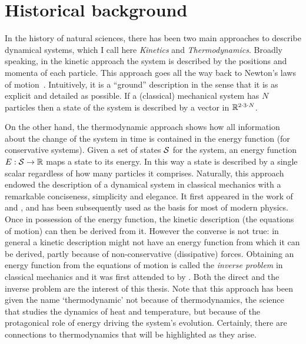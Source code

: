 % 
\section{Historical background}
In the history of natural sciences,
there has been two main approaches to describe dynamical systems,
which I call here
\emph{Kinetics} and \emph{Thermodynamics}.
Broadly speaking, in the kinetic approach the system is
described by the positions and momenta of each particle.
This approach goes all the way back to
Newton's laws of motion~\citep{newton}.
Intuitively, it is a ``ground'' description in the sense that
it is as explicit and detailed as possible.
If a (classical) mechanical system has $N$ particles
then a state of the system is described by
a vector in $\mathbb{R}^{2 \cdot 3 \cdot N}$.

On the other hand,
the thermodynamic approach shows how
all information about the change of the system in time
is contained in the energy function (for conservative systems).
Given a set of states $\mathcal{S}$ for the system,
an energy function $E: \mathcal{S} \to \mathbb{R}$ maps a state to its energy.
In this way a state is described by a single scalar
regardless of how many particles it comprises.
Naturally, this approach endowed the description of
a dynamical system in classical mechanics
with a remarkable conciseness, simplicity and elegance.
It first appeared in the work of
\citet{lagrange2} and \citet{hamilton},
and has been subsequently used as the basis for most of modern physics.
Once in possession of the energy function,
the kinetic description (\ie the equations of motion)
can then be derived from it. %
However the converse is not true:
in general a kinetic description might not have an energy function
from which it can be derived, %
partly because of non-conservative (\eg dissipative) forces.
Obtaining an energy function from the equations of motion
is called the \emph{inverse problem} in classical mechanics
\citep{santilli} and it was first attended to by \citet{helmholtz}.
Both the direct and the inverse problem are the interest of this thesis.
Note that this approach has been given the name `thermodynamic'
not because of thermodynamics,
the science that studies the dynamics of heat and temperature,
but because of the protagonical role of energy
driving the system's evolution.
Certainly, there are connections to thermodynamics
that will be highlighted as they arise.

